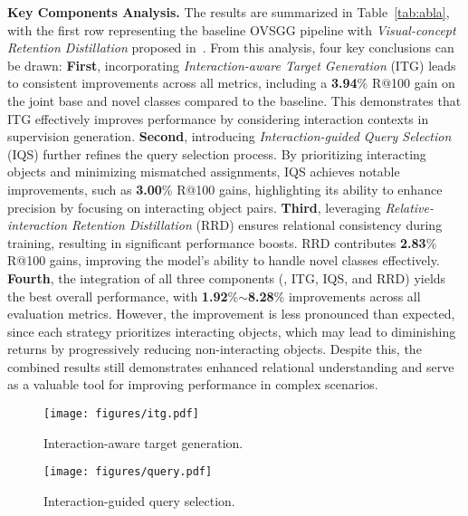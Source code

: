 \textbf{Key Components Analysis.} 
The results are summarized in Table~\ref{tab:abla}, with the first row representing the baseline OVSGG pipeline with \textit{Visual-concept Retention Distillation} proposed in~\cite{chen2024expanding}. From this analysis, four key conclusions can be drawn: \textbf{First}, incorporating \textit{Interaction-aware Target Generation} (ITG) leads to consistent improvements across all metrics, including a \textbf{3.94}\% R@100 gain on the joint base and novel classes compared to the baseline. This demonstrates that ITG effectively improves performance by considering interaction contexts in supervision generation. \textbf{Second}, introducing \textit{Interaction-guided Query Selection} (IQS) further refines the query selection process. By prioritizing interacting objects and minimizing mismatched assignments, IQS achieves notable improvements, such as \textbf{3.00}\% R@100 gains, highlighting its ability to enhance precision by focusing on interacting object pairs. \textbf{Third}, leveraging \textit{Relative-interaction Retention Distillation} (RRD) ensures relational consistency during training, resulting in significant performance boosts. RRD contributes \textbf{2.83}\% R@100 gains, improving the model's ability to handle novel classes effectively. \textbf{Fourth}, the integration of all three components (\ie, ITG, IQS, and RRD) yields the best overall performance, with \textbf{1.92}\%$\sim$\textbf{8.28}\% improvements across all evaluation metrics. However, the improvement is less pronounced than expected, since each strategy prioritizes interacting objects, which may lead to diminishing returns by progressively reducing non-interacting objects. Despite this, the combined results still demonstrates enhanced relational understanding and serve as a valuable tool for improving performance in complex scenarios.


\begin{figure}[!t]
    \centering
    \texttt{[image: figures/itg.pdf]}
    \vspace{-2.0em}
    \caption{Interaction-aware target generation.}
    \label{fig:itg}
    \vspace{-1.5em}
\end{figure}



\begin{figure}[!t]
    \centering
    \vspace{-0.3em}
    \texttt{[image: figures/query.pdf]}
    \vspace{-2.3em}
    \caption{Interaction-guided query selection.}
    \label{fig:iqs}
    \vspace{-1.2em}
\end{figure}




